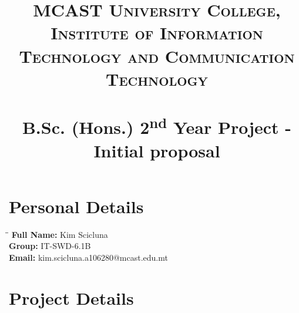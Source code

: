 \documentclass[paper=a4, fontsize=11pt]{scrartcl}
\title{	
\normalfont \normalsize 
\textsc{MCAST University College, \\Institute of Information Technology and Communication Technology} \\ [25pt] 
\horrule{0.5pt} \\[0.4cm]
\huge B.Sc. (Hons.) 2\textsuperscript{nd} Year Project - Initial proposal
\horrule{2pt} \\[0.5cm] 
}
\numberwithin{equation}{section} %
\numberwithin{figure}{section} %
\numberwithin{table}{section} %
\begin{document}
\maketitle

\section{Personal Details}

\begin{tabbing}
\hspace*{2cm}\=\hspace*{3cm}\= \kill
\textbf{Full Name:} \> Kim Scicluna\\
\textbf{Group:} \> IT-SWD-6.1B\\
\textbf{Email:} \> kim.scicluna.a106280@mcast.edu.mt\\
\end{tabbing}

\section{Project Details}
\end{document}
